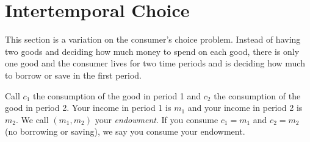 \documentclass{article}
\begin{document}
\section{Intertemporal Choice}
This section is a variation on the consumer's choice problem. Instead of having two goods and deciding how much money to spend on each good, there is only one good and the consumer lives for two time periods and is deciding how much to borrow or save in the first period.

Call $c_1$ the consumption of the good in period 1 and $c_2$ the consumption of the good in period 2. Your income in period 1 is $m_1$ and your income in period 2 is $m_2$. We call $\left( m_1,m_2 \right)$ your \emph{endowment}. If you consume $c_1=m_1$ and $c_2=m_2$ (no borrowing or saving), we say you consume your endowment.
\end{document}
